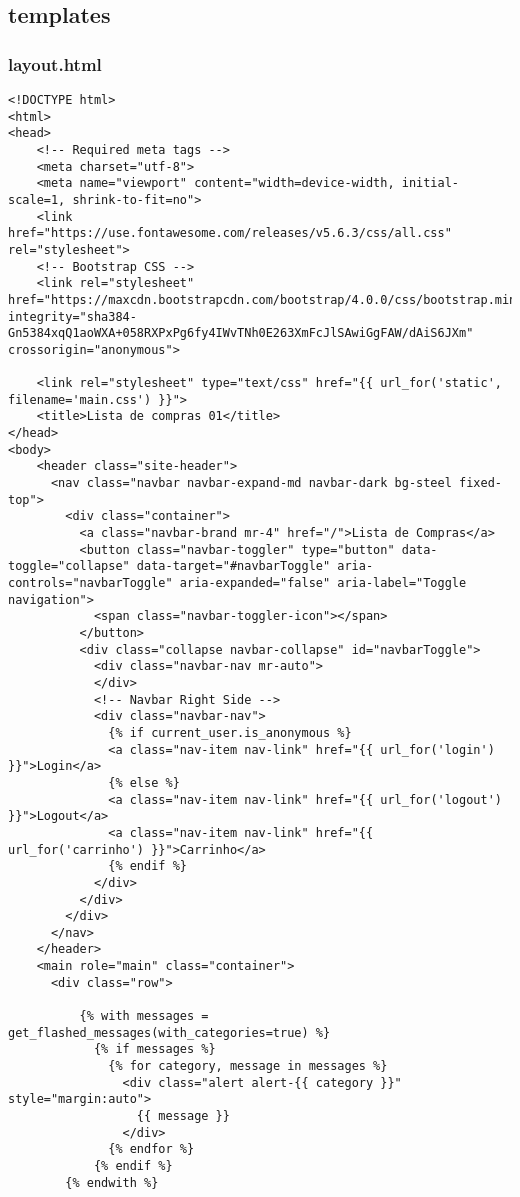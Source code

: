 \documentclass{report}
\begin{document}
\subsection{templates}
\subsubsection{layout.html}
\begin{lstlisting}
<!DOCTYPE html>
<html>
<head>
    <!-- Required meta tags -->
    <meta charset="utf-8">
    <meta name="viewport" content="width=device-width, initial-scale=1, shrink-to-fit=no">
    <link href="https://use.fontawesome.com/releases/v5.6.3/css/all.css" rel="stylesheet">
    <!-- Bootstrap CSS -->
    <link rel="stylesheet" href="https://maxcdn.bootstrapcdn.com/bootstrap/4.0.0/css/bootstrap.min.css" integrity="sha384-Gn5384xqQ1aoWXA+058RXPxPg6fy4IWvTNh0E263XmFcJlSAwiGgFAW/dAiS6JXm" crossorigin="anonymous">

    <link rel="stylesheet" type="text/css" href="{{ url_for('static', filename='main.css') }}">
    <title>Lista de compras 01</title>
</head>
<body>
    <header class="site-header">
      <nav class="navbar navbar-expand-md navbar-dark bg-steel fixed-top">
        <div class="container">
          <a class="navbar-brand mr-4" href="/">Lista de Compras</a>
          <button class="navbar-toggler" type="button" data-toggle="collapse" data-target="#navbarToggle" aria-controls="navbarToggle" aria-expanded="false" aria-label="Toggle navigation">
            <span class="navbar-toggler-icon"></span>
          </button>
          <div class="collapse navbar-collapse" id="navbarToggle">
            <div class="navbar-nav mr-auto">
            </div>
            <!-- Navbar Right Side -->
            <div class="navbar-nav">
              {% if current_user.is_anonymous %}
              <a class="nav-item nav-link" href="{{ url_for('login') }}">Login</a>
              {% else %}
              <a class="nav-item nav-link" href="{{ url_for('logout') }}">Logout</a>
              <a class="nav-item nav-link" href="{{ url_for('carrinho') }}">Carrinho</a>
              {% endif %}
            </div>
          </div>
        </div>
      </nav>
    </header>
    <main role="main" class="container">
      <div class="row">

          {% with messages = get_flashed_messages(with_categories=true) %}
            {% if messages %}
              {% for category, message in messages %}
                <div class="alert alert-{{ category }}" style="margin:auto">
                  {{ message }}
                </div>
              {% endfor %}
            {% endif %}
        {% endwith %}


\end{lstlisting}
\end{document}
